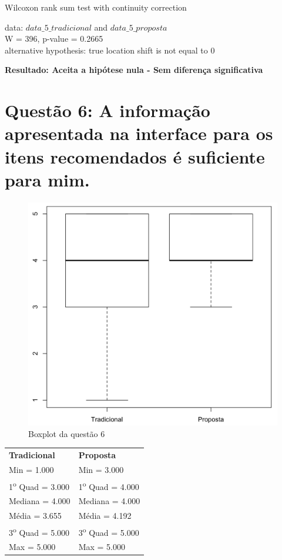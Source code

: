Wilcoxon rank sum test with continuity correction

\noindent
data:  $data\_5\_tradicional$ and $data\_5\_proposta$\\
W = 396, p-value = 0.2665\\
alternative hypothesis: true location shift is not equal to 0

\noindent
\textbf{Resultado: Aceita a hipótese nula - Sem diferença significativa}

\newpage
\section{Questão 6: A informação apresentada na interface para os itens recomendados é suficiente para mim.}

\begin{figure}[htb]
  \caption{\label{fig:questao6-boxplot}Boxplot da questão 6}
  \begin{center}
      \includegraphics[scale=0.4]{./Figuras/questao6-boxplot.png}
  \end{center}
\end{figure}

\begin{table}[h]
\begin{tabular}{p{}p{}}
\textbf{Tradicional} & \textbf{Proposta} \\
Min = 1.000 & Min = 3.000\\
1\textsuperscript{o} Quad = 3.000 & 1\textsuperscript{o} Quad = 4.000\\
Mediana = 4.000 & Mediana = 4.000\\
Média = 3.655 & Média = 4.192\\
3\textsuperscript{o} Quad = 5.000 & 3\textsuperscript{o} Quad = 5.000\\
Max = 5.000 & Max = 5.000\\
\end{tabular}
\end{table}

